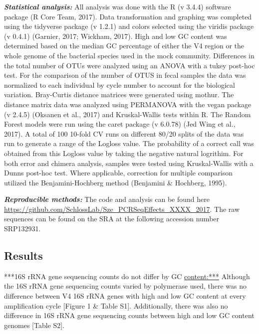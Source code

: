 \documentclass[11pt,]{article}
\begin{document}
\textbf{\emph{Statistical analysis:}} All analysis was done with the R
(v 3.4.4) software package (R Core Team, 2017). Data transformation and
graphing was completed using the tidyverse package (v 1.2.1) and colors
selected using the viridis package (v 0.4.1) (Garnier, 2017; Wickham,
2017). High and low GC content was determined based on the median GC
percentage of either the V4 region or the whole genome of the bacterial
species used in the mock community. Differences in the total number of
OTUs were analyzed using an ANOVA with a tukey post-hoc test. For the
comparison of the number of OTUS in fecal samples the data was
normalized to each individual by cycle number to account for the
biological variation. Bray-Curtis distance matrices were generated using
mothur. The distance matrix data was analyzed using PERMANOVA with the
vegan package (v 2.4.5) (Oksanen et al., 2017) and Kruskal-Wallis tests
within R. The Random Forest models were run using the caret package (v
6.0.78) (Jed Wing et al., 2017). A total of 100 10-fold CV runs on
different 80/20 splits of the data was run to generate a range of the
Logloss value. The probability of a correct call was obtained from this
Logloss value by taking the negative natural logrithim. For both error
and chimera analysis, samples were tested using Kruskal-Wallis with a
Dunns post-hoc test. Where applicable, correction for multiple
comparison utilized the Benjamini-Hochberg method (Benjamini \&
Hochberg, 1995).

\textbf{\emph{Reproducible methods:}} The code and analysis can be found
here \url{https://github.com/SchlossLab/Sze_PCRSeqEffects_XXXX_2017}.
The raw sequences can be found on the SRA at the following accession
number SRP132931.

\newpage

\subsection{Results}\label{results}

***16S rRNA gene sequencing counts do not differ by GC \url{content:***}
Although the 16S rRNA gene sequencing counts varied by polymerase used,
there was no difference between V4 16S rRNA genes with high and low GC
content at every amplification cycle {[}Figure 1 \& Table S1{]}.
Additionally, there was also no difference in 16S rRNA gene sequencing
counts between high and low GC content genomes {[}Table S2{]}.
\end{document}
